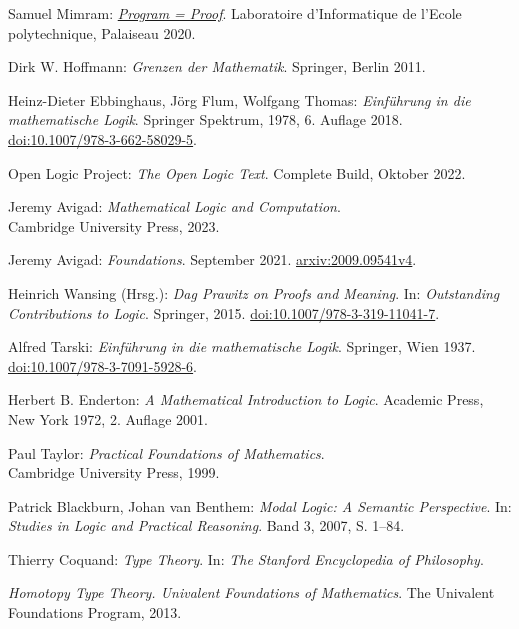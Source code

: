 \begin{thebibliography}{00}
Samuel Mimram:
\emph{\href{https://www.lix.polytechnique.fr/Labo/Samuel.Mimram/publications/}%
{Program = Proof}}.
Laboratoire d'Informatique de l'Ecole polytechnique, Palaiseau 2020.

Dirk W. Hoffmann: \emph{Grenzen der Mathematik}.
Springer, Berlin 2011.

Heinz-Dieter Ebbinghaus, Jörg Flum, Wolfgang Thomas:
\emph{Einführung in die mathematische Logik}.
Springer Spektrum, 1978, 6. Auflage 2018.\\
\href{https://doi.org/10.1007/978-3-662-58029-5}%
{doi:10.1007/978-3-662-58029-5}.

 Open Logic Project:
\emph{The Open Logic Text}. Complete Build, Oktober 2022.

 Jeremy Avigad:
\emph{Mathematical Logic and Computation}.\\
Cambridge University Press, 2023.

 Jeremy Avigad: \emph{Foundations}.
September 2021. \href{https://arxiv.org/abs/2009.09541v4}{arxiv:2009.09541v4}.

 Heinrich Wansing (Hrsg.):
\emph{Dag Prawitz on Proofs and Meaning}.
In: \emph{Outstanding Contributions to Logic}. Springer, 2015.
\href{https://doi.org/10.1007/978-3-319-11041-7}{doi:10.1007/978-3-319-11041-7}.

 Alfred Tarski:
\emph{Einführung in die mathematische Logik}. Springer, Wien 1937.\\
\href{https://doi.org/10.1007/978-3-7091-5928-6}{doi:10.1007/978-3-7091-5928-6}.

 Herbert B. Enderton:
\emph{A Mathematical Introduction to Logic}.
Academic Press, New York 1972, 2. Auflage 2001.

 Paul Taylor:
\emph{Practical Foundations of Mathematics}.\\
Cambridge University Press, 1999.

 Patrick Blackburn, Johan van Benthem:
\emph{Modal Logic: A Semantic Perspective}.
In: \emph{Studies in Logic and Practical Reasoning}.
Band 3, 2007, S. 1--84.

 Thierry Coquand:
\emph{Type Theory}. In: \emph{The Stanford Encyclopedia of Philosophy}.

\emph{Homotopy Type Theory. Univalent Foundations of Mathematics}.
The Univalent Foundations Program, 2013.


\end{thebibliography}
